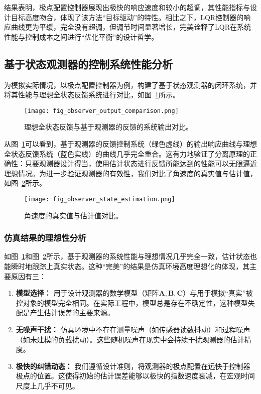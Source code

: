 \documentclass[12pt, a4paper]{article}
\begin{document}
结果表明，极点配置控制器展现出极快的响应速度和较小的超调，其性能指标与设计目标高度吻合，体现了该方法“目标驱动”的特性。相比之下，LQR控制器的响应曲线更为平缓，完全没有超调，但调节时间显著增长，完美诠释了LQR在系统性能与控制成本之间进行“优化平衡”的设计哲学。

\subsection{基于状态观测器的控制系统性能分析}
为模拟实际情况，以极点配置控制器为例，构建了基于状态观测器的闭环系统，并将其性能与理想全状态反馈系统进行对比，如图~\ref{fig:observer_output}所示。

\begin{figure}[htbp]
    \centering
    \texttt{[image: fig\_observer\_output\_comparison.png]}
    \caption{理想全状态反馈与基于观测器的反馈的系统输出对比。}
    \label{fig:observer_output}
\end{figure}

从图~\ref{fig:observer_output}可以看到，基于观测器的反馈控制系统（绿色虚线）的输出响应曲线与理想全状态反馈系统（蓝色实线）的曲线几乎完全重合。这有力地验证了分离原理的正确性：只要观测器设计得当，使用估计状态进行反馈所能达到的性能可以无限逼近理想情况。为进一步验证观测器的有效性，我们对比了角速度的真实值与估计值，如图~\ref{fig:observer_estimation}所示。

\begin{figure}[htbp]
    \centering
    \texttt{[image: fig\_observer\_state\_estimation.png]}
    \caption{角速度的真实值与估计值对比。}
    \label{fig:observer_estimation}
\end{figure}

\subsubsection{仿真结果的理想性分析}
如图~\ref{fig:observer_output}和图~\ref{fig:observer_estimation}所示，基于观测器的系统性能与理想情况几乎完全一致，估计状态也能瞬时地跟踪上真实状态。这种“完美”的结果是仿真环境高度理想化的体现，其主要原因有三：
\begin{enumerate}
    \item \textbf{模型选择：} 用于设计观测器的数学模型（矩阵$\bm{A}, \bm{B}, \bm{C}$）与用于模拟“真实”被控对象的模型完全相同。在实际工程中，模型总是存在不确定性，这种模型失配是产生估计误差的主要来源。
    \item \textbf{无噪声干扰：} 仿真环境中不存在测量噪声（如传感器读数抖动）和过程噪声（如未建模的负载扰动）。这些随机噪声在现实中会持续干扰观测器的估计精度。
    \item \textbf{极快的纠错动态：} 我们遵循设计准则，将观测器的极点配置在远快于控制器极点的位置。这使得初始的估计误差能够以极快的指数速度衰减，在宏观时间尺度上几乎不可见。
\end{enumerate}
\end{document}
